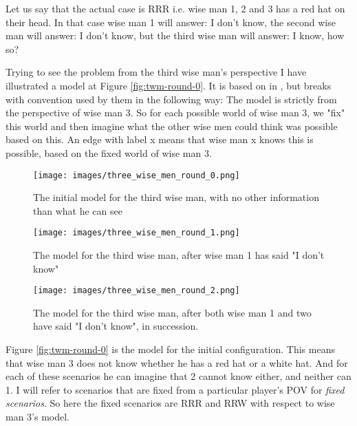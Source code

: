 Let us say that the actual case is RRR i.e. wise man 1, 2 and 3 has a red hat on their head.
In that case wise man 1 will answer: I don't know, the second wise man will answer: I don't know, but the third wise man will answer: I know, how so?

Trying to see the problem from the third wise man's perspective I have illustrated a model at Figure \ref{fig:twm-round-0}. It is based on \KTfourfiveN in \cite{HuthAndRyan2004KT45n}, but breaks with convention used by them in the following way:
The model is strictly from the perspective of wise man 3. So for each possible world of wise man 3, we "fix" this world and then imagine what the other wise men could think was possible based on this. An edge with label x means that wise man x knows this is possible, based on the fixed world of wise man 3.

\begin{figure}
	\begin{minipage}[c]{3cm}
\texttt{[image: images/three\_wise\_men\_round\_0.png]}
	\caption{The initial model for the third wise man, with no other information than what he can see}

	\label{fig:twm-round-0}
\end{minipage}
\hfill
	\begin{minipage}[c]{3cm}
	\texttt{[image: images/three\_wise\_men\_round\_1.png]}
	\caption{The model for the third wise man, after wise man 1 has said "I don't know"}

	\label{fig:twm-round-1}
\end{minipage}
\hfill
	\begin{minipage}[c]{3cm}
	\texttt{[image: images/three\_wise\_men\_round\_2.png]}
	\caption{The model for the third wise man, after both wise man 1 and two have said "I don't know", in succession.}

	\label{fig:twm-round-2}
\end{minipage}
\end{figure}



Figure \ref{fig:twm-round-0} is the model for the initial configuration. This means that wise man 3 does not know whether he has a red hat or a white hat. And for each of these scenarios he can imagine that 2 cannot know either, and neither can 1. I will refer to scenarios that are fixed from a particular player's POV for \emph{fixed scenarios}. So here the fixed scenarios are RRR and RRW with respect to wise man 3's model.

